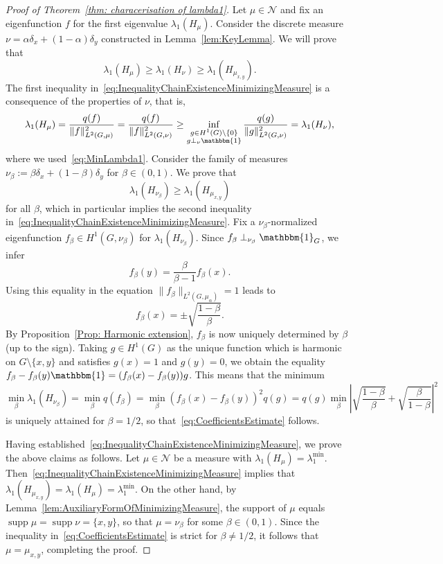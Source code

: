\documentclass[reqno]{amsart}
\theoremstyle{plain}
\theoremstyle{definition}
\theoremstyle{remark}
\numberwithin{equation}{section}
\newcommand{\cN}{\mathcal{N}}
\newcommand{\one}{\mathbbm{1}}
\newcommand{\supp}{\operatorname{supp}}
\begin{document}
\begin{proof}[Proof of Theorem~\ref{thm: characerisation of lambda1}]
	Let $\mu \in \cN$ and fix an eigenfunction $f$ for the first eigenvalue $\lambda_1(H_\mu)$. Consider the discrete measure $\nu= \alpha \delta_x +(1-\alpha) \delta_y$ constructed in Lemma~\ref{lem:KeyLemma}. We will prove that
	\begin{equation} \label{eq:InequalityChainExistenceMinimizingMeasure}
		\lambda_1(H_\mu) \ge \lambda_1(H_\nu) \ge \lambda_1(H_{\mu_{x,y}}).
	\end{equation}
	The first inequality in~\eqref{eq:InequalityChainExistenceMinimizingMeasure} is a consequence of the properties of $\nu$, that is,
	\[
	\lambda_1(H_{\mu})= \frac{q(f)}{\|f\|^2_{L^2(G, \mu)}} = \frac{q(f)}{\|f\|^2_{L^2(G, \nu)}}  \ge \inf_{\substack{g \in H^1(G)\setminus \{0\} \\ g \perp_{\nu} \one}} \frac{q(g)}{\|g\|^2_{L^2(G, \nu)}} = \lambda_{1}(H_\nu),
	\]
	where we used~\eqref{eq:MinLambda1}. Consider the family of measures $\nu_\beta := \beta \delta_x + (1-\beta) \delta_y$ for $\beta \in (0,1)$. We prove that
	\begin{equation} \label{eq:CoefficientsEstimate}
		\lambda_1(H_{\nu_\beta}) \ge \lambda_1(H_{\mu_{x,y}})
	\end{equation}
	for all $\beta$, which in particular implies the second inequality in~\eqref{eq:InequalityChainExistenceMinimizingMeasure}. Fix a $\nu_\beta$-normalized eigenfunction $f_\beta \in H^1(G, \nu_\beta)$ for $\lambda_1(H_{\nu_\beta})$. Since $f_\beta \perp_{\nu_\beta} \one_G$, we infer
	\[
	f_\beta (y) = \frac{\beta}{\beta -1} f_\beta(x).
	\]
	Using this equality in the equation $\|f_\beta\|_{L^2(G,\mu_\alpha)} =1$ leads to
	\[
	f_\beta(x) = \pm \sqrt{\frac{1-\beta}{\beta}}.
	\]
	By Proposition~\ref{Prop: Harmonic extension}, $f_\beta$ is now uniquely determined by $\beta$ (up to the sign). Taking $g \in H^1(G)$ as the unique function which is harmonic on $G\setminus \{x,y\}$ and satisfies $g(x) = 1$ and $g(y) = 0$, we obtain the equality $f_\beta - f_\beta(y)\one= (f_\beta(x) - f_\beta(y)) g$. This means that the minimum
	\[
	\min_\beta  \lambda_1(H_{\nu_\beta})  = \min_\beta q(f_\beta) =  \min_\beta (f_\beta(x) - f_\beta(y))^2 q(g) = q(g) \min_\beta \left|\sqrt{\frac{1-\beta}{\beta}} + \sqrt{\frac{\beta}{1-\beta}} \right|^2
	\]
	is uniquely attained for $\beta = 1/2$, so that~\eqref{eq:CoefficientsEstimate} follows.
	
	Having established~\eqref{eq:InequalityChainExistenceMinimizingMeasure}, we prove the above claims as follows. Let $\mu \in \cN$ be a measure with $\lambda_1(H_\mu)  = \lambda_1^{\min}$. Then~\eqref{eq:InequalityChainExistenceMinimizingMeasure} implies that $\lambda_1(H_{\mu_{x,y}}) = \lambda_1(H_\mu) = \lambda_1^{\min}$. On the other hand, by Lemma~\ref{lem:AuxiliaryFormOfMinimizingMeasure}, the support of $\mu$ equals $\supp \mu = \supp \nu=\{x,y\}$, so that $\mu = \nu_\beta$ for some $\beta \in (0,1)$. Since the inequality in~\eqref{eq:CoefficientsEstimate} is strict for $\beta \neq1/2$, it follows that $\mu  = \mu_{x,y}$, completing the proof.
\end{proof}
\end{document}
